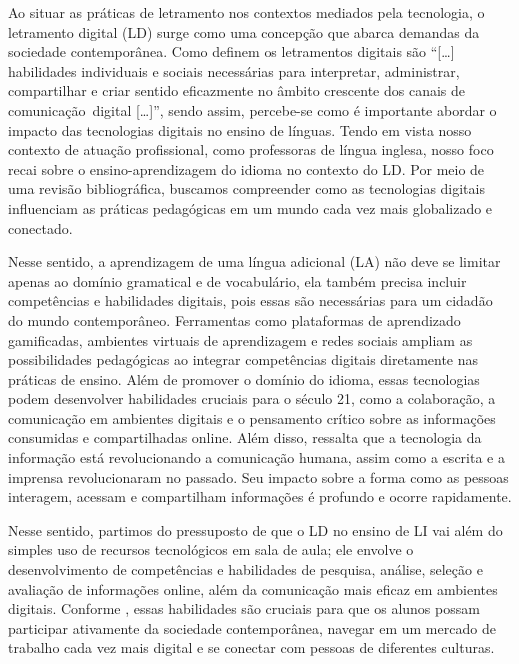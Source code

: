 Ao situar as práticas de letramento nos contextos mediados pela
tecnologia, o letramento digital (LD) surge como uma concepção que
abarca demandas da sociedade contemporânea. Como definem \textcite[p.~17]{dudeney2016letramentos}
 os letramentos digitais são ``{[}\ldots{]}
habilidades individuais e sociais necessárias para interpretar,
administrar, compartilhar e criar sentido eficazmente no âmbito
crescente dos canais de comunicação~digital {[}\ldots{]}'', sendo assim,
percebe-se como é importante abordar o impacto das tecnologias digitais
no ensino de línguas. Tendo em vista nosso contexto de atuação
profissional, como professoras de língua inglesa, nosso foco recai sobre
o ensino-aprendizagem do idioma no contexto do LD. Por meio de uma
revisão bibliográfica, buscamos compreender como as tecnologias digitais
influenciam as práticas pedagógicas em um mundo cada vez mais
globalizado e conectado.

Nesse sentido, a aprendizagem de uma língua adicional (LA) não deve se
limitar apenas ao domínio gramatical e de vocabulário, ela também
precisa incluir competências e habilidades digitais, pois essas são
necessárias para um cidadão do mundo contemporâneo. Ferramentas como
plataformas de aprendizado gamificadas, ambientes virtuais de
aprendizagem e redes sociais ampliam as possibilidades pedagógicas ao
integrar competências digitais diretamente nas práticas de ensino. Além
de promover o domínio do idioma, essas tecnologias podem desenvolver
habilidades cruciais para o século 21, como a colaboração, a comunicação
em ambientes digitais e o pensamento crítico sobre as informações
consumidas e compartilhadas online. Além disso, \textcite{warschauer2000changing} ressalta que a tecnologia da informação está revolucionando a
comunicação humana, assim como a escrita e a imprensa revolucionaram no
passado. Seu impacto sobre a forma como as pessoas interagem, acessam e
compartilham informações é profundo e ocorre rapidamente.

Nesse sentido, partimos do pressuposto de que o LD no ensino de LI vai
além do simples uso de recursos tecnológicos em sala de aula; ele
envolve o desenvolvimento de competências e habilidades de pesquisa,
análise, seleção e avaliação de informações online, além da comunicação
mais eficaz em ambientes digitais. Conforme \textcite{dudeney2016letramentos}, essas habilidades são cruciais para que os alunos possam
participar ativamente da sociedade contemporânea, navegar em um mercado
de trabalho cada vez mais digital e se conectar com pessoas de
diferentes culturas.

